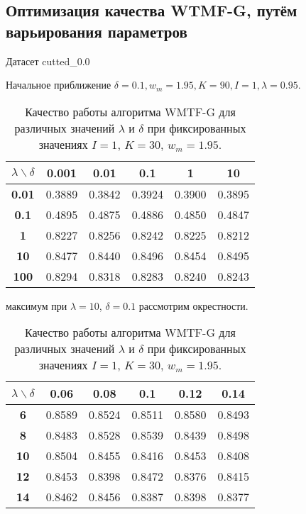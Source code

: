 \subsection{Оптимизация качества WTMF-G, путём варьирования параметров}

    Датасет cutted\_0.0

    Начальное приближение $\delta=0.1, w_m=1.95, K=90, I=1, \lambda=0.95$.

    \begin{table}[ht!]
        \caption{Качество работы алгоритма WMTF-G для различных значений $\lambda$ и $\delta$ при фиксированных значениях $I=1$, $K=30$, $w_m=1.95$. \bigskip}
        \centering

        \label{tabular:wtmfg_test1}
        \begin{tabular}{|c|c|c|c|c|c|} \hline
            $\lambda \backslash \delta$ & \bf{0.001} & \bf{0.01} & \bf{0.1} & \bf{1} & \bf{10}  \\ \hline
            \bf{0.01} & 0.3889 & 0.3842 & 0.3924 & 0.3900 & 0.3895 \\ \hline
            \bf{0.1}  & 0.4895 & 0.4875 & 0.4886 & 0.4850 & 0.4847  \\ \hline
            \bf{1}    & 0.8227 & 0.8256 & 0.8242 & 0.8225 & 0.8212 \\ \hline
            \bf{10}   & 0.8477 & 0.8440 & 0.8496 & 0.8454 & 0.8495 \\ \hline
            \bf{100}  & 0.8294 & 0.8318 & 0.8283 & 0.8240  & 0.8243 \\ \hline
        \end{tabular}
    \end{table}

    максимум при $\lambda=10$, $\delta=0.1$  рассмотрим окрестности.

    \begin{table}[ht!]
        \caption{Качество работы алгоритма WMTF-G для различных значений $\lambda$ и $\delta$ при фиксированных значениях $I=1$, $K=30$, $w_m=1.95$. \bigskip}
        \centering

        \label{tabular:wtmfg_test1}
        \begin{tabular}{|c|c|c|c|c|c|} \hline
            $\lambda \backslash \delta$ & \bf{0.06} & \bf{0.08} & \bf{0.1} & \bf{0.12} & \bf{0.14}  \\ \hline
            \bf{6}  & 0.8589 & 0.8524 & 0.8511 & 0.8580 & 0.8493 \\ \hline
            \bf{8}  & 0.8483 & 0.8528 & 0.8539 & 0.8439 & 0.8498  \\ \hline
            \bf{10} & 0.8504 & 0.8455 & 0.8416 & 0.8453 & 0.8408  \\ \hline
            \bf{12} & 0.8453 & 0.8398 & 0.8472 & 0.8376 & 0.8415   \\ \hline
            \bf{14} & 0.8462 & 0.8456 & 0.8387 & 0.8398 & 0.8377 \\ \hline
        \end{tabular}
    \end{table}

